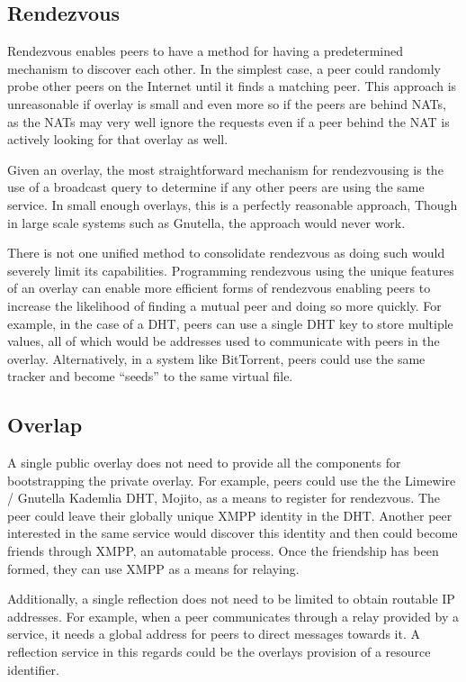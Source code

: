 \documentclass[conference]{IEEEtran}
\begin{document}
\subsection{Rendezvous}

Rendezvous enables peers to have a method for having a predetermined mechanism
to discover each other.  In the simplest case, a peer could randomly probe
other peers on the Internet until it finds a matching peer.  This approach is
unreasonable if overlay is small and even more so if the peers are behind NATs,
as the NATs may very well ignore the requests even if a peer behind the NAT
is actively looking for that overlay as well.

Given an overlay, the most straightforward mechanism for rendezvousing is the
use of a broadcast query to determine if any other peers are using the same
service.  In small enough overlays, this is a perfectly reasonable approach,
Though in large scale systems such as Gnutella, the approach would never work.

There is not one unified method to consolidate rendezvous as doing such would
severely limit its capabilities.  Programming rendezvous using the unique
features of an overlay can enable more efficient forms of rendezvous enabling
peers to increase the likelihood of finding a mutual peer and doing so more
quickly.  For example, in the case of a DHT, peers can use a single DHT key
to store multiple values, all of which would be addresses used to communicate
with peers in the overlay.  Alternatively, in a system like BitTorrent, peers
could use the same tracker and become ``seeds'' to the same virtual file.

\subsection{Overlap}

A single public overlay does not need to provide all the components for
bootstrapping the private overlay.  For example, peers could use the the
Limewire / Gnutella Kademlia DHT, Mojito, as a means to register for
rendezvous.  The peer could leave their globally unique XMPP identity in the
DHT.  Another peer interested in the same service would discover this identity
and then could become friends through XMPP, an automatable process.  Once the
friendship has been formed, they can use XMPP as a means for relaying.

Additionally, a single reflection does not need to be limited to obtain
routable IP addresses.  For example, when a peer communicates through a
relay provided by a service, it needs a global address for peers to direct
messages towards it.  A reflection service in this regards could be the
overlays provision of a resource identifier.
\end{document}
